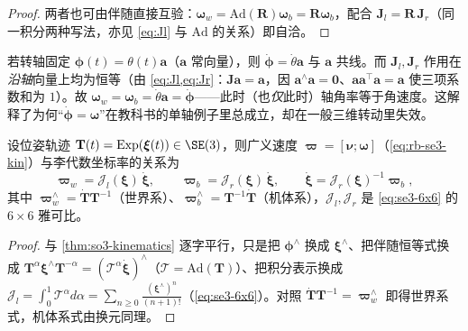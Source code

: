 \begin{proof}
两者也可由伴随直接互验：$\boldsymbol{\omega}_w=\mathrm{Ad}(\mathbf{R})\boldsymbol{\omega}_b=\mathbf{R}\boldsymbol{\omega}_b$，配合 $\mathbf{J}_l=\mathbf{R}\,\mathbf{J}_r$（同一积分两种写法，亦见 \cref{eq:Jl} 与 $\mathrm{Ad}$ 的关系）即自洽。
\end{proof}

\begin{corollary}[匀轴转动时 $\dot{\boldsymbol{\phi}}=\boldsymbol{\omega}$]\label{cor:fixed-axis}
若转轴固定 $\boldsymbol{\phi}(t)=\theta(t)\mathbf{a}$（$\mathbf{a}$ 常向量），则 $\dot{\boldsymbol{\phi}}=\dot{\theta}\mathbf{a}$ 与 $\mathbf{a}$ 共线。而 $\mathbf{J}_l,\mathbf{J}_r$ 作用在\emph{沿轴}向量上均为恒等（由 \cref{eq:Jl,eq:Jr}：$\mathbf{J}\mathbf{a}=\mathbf{a}$，因 $\mathbf{a}^\wedge\mathbf{a}=\mathbf{0}$、$\mathbf{a}\mathbf{a}^\top\mathbf{a}=\mathbf{a}$ 使三项系数和为 $1$）。故 $\boldsymbol{\omega}_w=\boldsymbol{\omega}_b=\dot{\theta}\mathbf{a}=\dot{\boldsymbol{\phi}}$——此时（也\emph{仅}此时）轴角率等于角速度。这解释了为何“$\dot{\boldsymbol{\phi}}=\boldsymbol{\omega}$”在教科书的单轴例子里总成立，却在一般三维转动里失效。
\end{corollary}

\begin{theorem}[位姿运动学的李代数形式：$\boldsymbol{\varpi}=\boldsymbol{\mathcal{J}}\dot{\boldsymbol{\xi}}$]\label{thm:se3-kinematics}
设位姿轨迹 $\mathbf{T}(t)=\mathrm{Exp}(\boldsymbol{\xi}(t))\in\SE(3)$，则广义速度 $\boldsymbol{\varpi}=[\boldsymbol{\nu};\boldsymbol{\omega}]$（\cref{eq:rb-se3-kin}）与李代数坐标率的关系为
\begin{equation}
  \boldsymbol{\varpi}_w=\boldsymbol{\mathcal{J}}_l(\boldsymbol{\xi})\,\dot{\boldsymbol{\xi}},\qquad
  \boldsymbol{\varpi}_b=\boldsymbol{\mathcal{J}}_r(\boldsymbol{\xi})\,\dot{\boldsymbol{\xi}},\qquad
  \dot{\boldsymbol{\xi}}=\boldsymbol{\mathcal{J}}_r(\boldsymbol{\xi})^{-1}\boldsymbol{\varpi}_b,
  \label{eq:se3-kinematics}
\end{equation}
其中 $\boldsymbol{\varpi}_w^\wedge=\dot{\mathbf{T}}\mathbf{T}^{-1}$（世界系）、$\boldsymbol{\varpi}_b^\wedge=\mathbf{T}^{-1}\dot{\mathbf{T}}$（机体系），$\boldsymbol{\mathcal{J}}_l,\boldsymbol{\mathcal{J}}_r$ 是 \cref{eq:se3-6x6} 的 $6\times6$ 雅可比。
\end{theorem}
\begin{proof}
与 \cref{thm:so3-kinematics} 逐字平行，只是把 $\boldsymbol{\phi}^\wedge$ 换成 $\boldsymbol{\xi}^\wedge$、把伴随恒等式换成 $\mathbf{T}^\alpha\boldsymbol{\xi}^\wedge\mathbf{T}^{-\alpha}=(\boldsymbol{\mathcal{T}}^\alpha\dot{\boldsymbol{\xi}})^\wedge$（$\boldsymbol{\mathcal{T}}=\mathrm{Ad}(\mathbf{T})$）、把积分表示换成 $\boldsymbol{\mathcal{J}}_l=\int_0^1\boldsymbol{\mathcal{T}}^\alpha d\alpha=\sum_{n\ge0}\tfrac{(\boldsymbol{\xi}^\curlywedge)^n}{(n+1)!}$（\cref{eq:se3-6x6}）。对照 $\dot{\mathbf{T}}\mathbf{T}^{-1}=\boldsymbol{\varpi}_w^\wedge$ 即得世界系式，机体系式由换元同理。
\end{proof}

